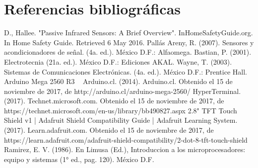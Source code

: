 \documentclass[conference]{IEEEtran}
\begin{document}
\section{Referencias bibliográficas}
\begin{thebibliography}{00}
 D., Hallee. "Passive Infrared Sensors: A Brief Overview". InHomeSafetyGuide.org. In Home Safety Guide. Retrieved 6 May 2016.
 Pallás Areny, R. (2007). Sensores y acondicionadores de señal. (4a. ed.). México D.F.: Alfaomega.
 Bastian, P. (2001). Electrotecnia (21a. ed.). México D.F.: Ediciones AKAL.
 Wayne, T. (2003). Sistemas de Comunicaciones Electrónicas. (4a. ed.). México D.F.: Prentice Hall.
 Arduino Mega 2560 R3 ~ Arduino.cl. (2014). Arduino.cl. Obtenido el 15 de noviembre de 2017, de http://arduino.cl/arduino-mega-2560/
 HyperTerminal. (2017). Technet.microsoft.com. Obtenido el 15 de noviembre de 2017, de https://technet.microsoft.com/en-us/library/bb490827.aspx
 2.8" TFT Touch Shield v1 | Adafruit Shield Compatibility Guide | Adafruit Learning System. (2017). Learn.adafruit.com. Obtenido el 15 de noviembre de 2017, de https://learn.adafruit.com/adafruit-shield-compatibility/2-dot-8-tft-touch-shield
 Ramirez, E. V. (1986). En Limusa (Ed.), Introduccion a los microprocesadores: equipo y sistemas (1° ed., pag. 120). México D.F.
\end{thebibliography}
\end{document}
